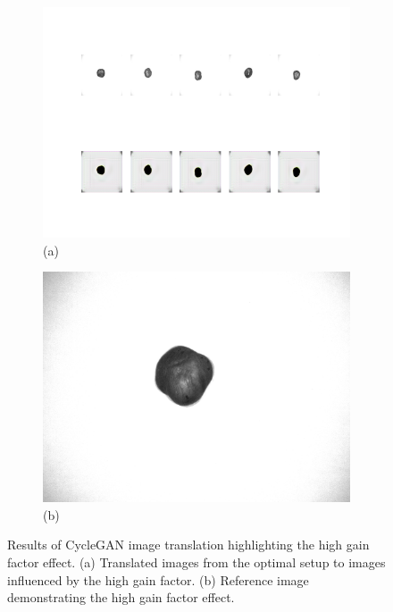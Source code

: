 \documentclass[12pt,DIV14,BCOR12mm,a4paper,footinclude=false,headinclude,parskip=half-,twoside,openright,cleardoublepage=empty,toc=index,bibliography=totoc,listof=totoc]{scrreprt}
\numberwithin{equation}{chapter}
\begin{document}
\begin{figure}
    \centering
    \begin{subfigure}[b]{0.85\textwidth}
        \centering
        \includegraphics[width=\textwidth]{../media/high_gain.png}
        \caption*{(a)}
    \end{subfigure}
    \hfill
    \begin{subfigure}[b]{0.25\textwidth}
        \centering
        \includegraphics[width=\textwidth]{../media/high_gain_real.png}
        \caption*{(b)}
    \end{subfigure}
    \caption{Results of CycleGAN image translation highlighting the high gain factor effect. (a) Translated images from the optimal setup to images influenced by the high gain factor. (b) Reference image demonstrating the high gain factor effect.}
    \label{fig:high_gain_factor_result}
\end{figure}
\end{document}
